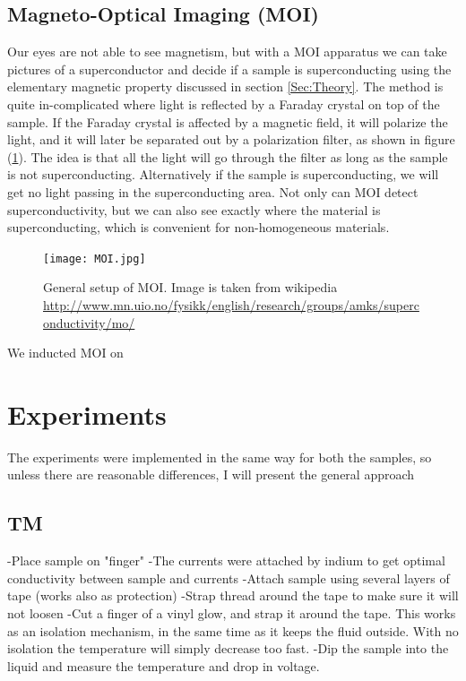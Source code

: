 \documentclass{comjnl}
\begin{document}
\subsection{Magneto-Optical Imaging (MOI)}
Our eyes are not able to see magnetism, but with a MOI apparatus we can take pictures of a superconductor and decide if a sample is superconducting using the elementary magnetic property discussed in section \ref{Sec:Theory}. The method is quite in-complicated where light is reflected by a Faraday crystal on top of the sample. If the Faraday crystal is affected by a magnetic field, it will polarize the light, and it will later be separated out by a polarization filter, as shown in figure (\ref{fig:MOI}). The idea is that all the light will go through the filter as long as the sample is not superconducting. Alternatively if the sample is superconducting, we will get no light passing in the superconducting area. Not only can MOI detect superconductivity, but we can also see exactly where the material is superconducting, which is convenient for non-homogeneous materials. 
\begin{figure}[h]
\centering
\texttt{[image: MOI.jpg]}
\caption{General setup of MOI. Image is taken from wikipedia \url{http://www.mn.uio.no/fysikk/english/research/groups/amks/superconductivity/mo/} \label{fig:MOI}}
\end{figure}
We inducted MOI on 

\section{Experiments} \label{Sec:Experiments}
The experiments were implemented in the same way for both the samples, so unless there are reasonable differences, I will present the general approach

\subsection{TM}
-Place sample on "finger"
-The currents were attached by indium to get optimal conductivity between sample and currents
-Attach sample using several layers of tape (works also as protection)
-Strap thread around the tape to make sure it will not loosen
-Cut a finger of a vinyl glow, and strap it around the tape. This works as an isolation mechanism, in the same time as it keeps the fluid outside. With no isolation the temperature will simply decrease too fast.
-Dip the sample into the liquid and measure the temperature and drop in voltage.
\end{document}
